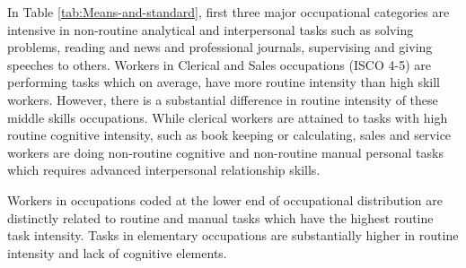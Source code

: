 \begin{onehalfspace}
In Table \ref{tab:Means-and-standard}, first three major occupational
categories are intensive in non-routine analytical and interpersonal
tasks such as solving problems, reading and news and professional
journals, supervising and giving speeches to others. Workers in Clerical
and Sales occupations (ISCO 4-5) are performing tasks which on average,
have more routine intensity than high skill workers. However, there
is a substantial difference in routine intensity of these middle skills
occupations. While clerical workers are attained to tasks with high
routine cognitive intensity, such as book keeping or calculating,
sales and service workers are doing non-routine cognitive and non-routine
manual personal tasks which requires advanced interpersonal relationship
skills.

Workers in occupations coded at the lower end of occupational distribution
are distinctly related to routine and manual tasks which have the
highest routine task intensity. Tasks in elementary occupations are
substantially higher in routine intensity and lack of cognitive elements.
\end{onehalfspace}
\begin{center}
\pagebreak
\par\end{center}

